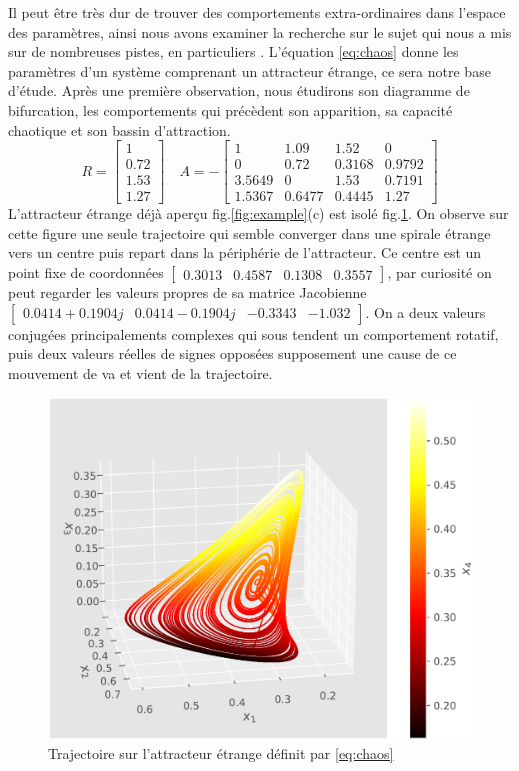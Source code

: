 \documentclass{wsdcr}
\begin{document}
Il peut être très dur de trouver des comportements extra-ordinaires dans l'espace des paramètres, ainsi nous avons examiner la recherche sur le sujet qui nous a mis sur de nombreuses pistes, en particuliers \cite{vano2006}. L'équation \ref{eq:chaos} donne les paramètres d'un système comprenant un attracteur étrange, ce sera notre base d'étude. Après une première observation, nous étudirons son diagramme de bifurcation, les comportements qui précèdent son apparition, sa capacité chaotique et son bassin d'attraction. 
\begin{equation}
R={\begin{bmatrix}1\\0.72\\1.53\\1.27\end{bmatrix}}\quad A =-{\begin{bmatrix}1&1.09&1.52&0\\0&0.72&0.3168&0.9792\\3.5649&0&1.53&0.7191\\1.5367&0.6477&0.4445&1.27\end{bmatrix}}
\label{eq:chaos}
\end{equation}
L'attracteur étrange déjà aperçu fig.\ref{fig:example}(c) est isolé fig.\ref{fig:ae4}. On observe sur cette figure une seule trajectoire qui semble converger dans une spirale étrange vers un centre puis repart dans la périphérie de l'attracteur. Ce centre est un point fixe de coordonnées $\begin{bmatrix}0.3013&0.4587&0.1308&0.3557\end{bmatrix}$, par curiosité on peut regarder les valeurs propres de sa matrice Jacobienne $\begin{bmatrix}0.0414+0.1904j&0.0414-0.1904j&-0.3343&-1.032\end{bmatrix}$. On a deux valeurs conjugées principalements complexes qui sous tendent un comportement rotatif, puis deux valeurs réelles de signes opposées supposement une cause de ce mouvement de va et vient de la trajectoire. 
\begin{figure}
    \centering
    \includegraphics[width=\linewidth]{fig/lv4_ae4.png}
    \caption{Trajectoire sur l'attracteur étrange définit par \ref{eq:chaos}}
    \label{fig:ae4}
\end{figure}
\end{document}

